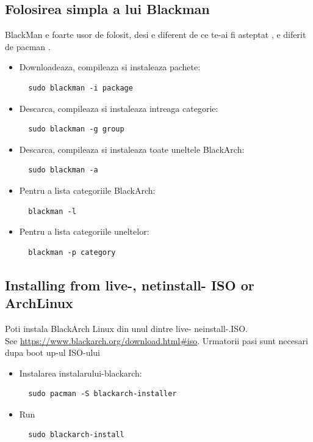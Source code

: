 \documentclass[a4paper, oneside, 11pt]{book}
\begin{document}
\subsection{Folosirea simpla a lui Blackman } BlackMan e foarte usor de folosit, desi e diferent de ce te-ai fi asteptat , e diferit de pacman .
\begin{itemize}
\item Downloadeaza, compileaza si instaleaza pachete:
\begin{lstlisting}
  sudo blackman -i package
\end{lstlisting}

\item Descarca, compileaza si instaleaza intreaga categorie:
\begin{lstlisting}
  sudo blackman -g group
\end{lstlisting}

\item Descarca, compileaza si instaleaza toate uneltele BlackArch:
\begin{lstlisting}
  sudo blackman -a
\end{lstlisting}

\item Pentru a lista categoriile BlackArch:
\begin{lstlisting}
  blackman -l
\end{lstlisting}

\item Pentru a lista categoriile uneltelor:
\begin{lstlisting}
  blackman -p category
\end{lstlisting}

\end{itemize}

\subsection{Installing from live-, netinstall- ISO or ArchLinux}
Poti instala BlackArch Linux din unul dintre live- neinstall-.ISO.\\See
\url{https://www.blackarch.org/download.html#iso}. Urmatorii pasi sunt necesari dupa boot up-ul ISO-ului
\begin{itemize}
\item Instalarea instalarului-blackarch:
\begin{lstlisting}
  sudo pacman -S blackarch-installer
\end{lstlisting}

\item Run
\begin{lstlisting}
  sudo blackarch-install
\end{lstlisting}

\end{itemize}
\end{document}
